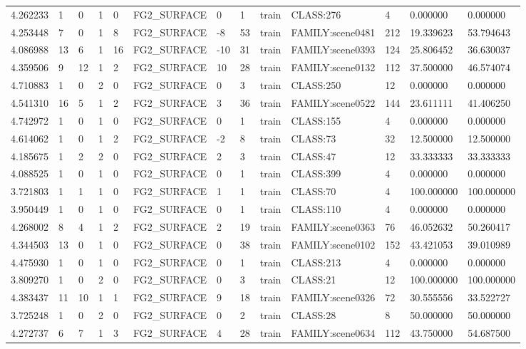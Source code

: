 \begin{tabular}{lllllllllllll}
4.262233 & 1 & 0 & 1 & 0 & FG2\_SURFACE & 0 & 1 & train & CLASS:276 & 4 & 0.000000 & 0.000000 \\
4.253448 & 7 & 0 & 1 & 8 & FG2\_SURFACE & -8 & 53 & train & FAMILY:scene0481 & 212 & 19.339623 & 53.794643 \\
4.086988 & 13 & 6 & 1 & 16 & FG2\_SURFACE & -10 & 31 & train & FAMILY:scene0393 & 124 & 25.806452 & 36.630037 \\
4.359506 & 9 & 12 & 1 & 2 & FG2\_SURFACE & 10 & 28 & train & FAMILY:scene0132 & 112 & 37.500000 & 46.574074 \\
4.710883 & 1 & 0 & 2 & 0 & FG2\_SURFACE & 0 & 3 & train & CLASS:250 & 12 & 0.000000 & 0.000000 \\
4.541310 & 16 & 5 & 1 & 2 & FG2\_SURFACE & 3 & 36 & train & FAMILY:scene0522 & 144 & 23.611111 & 41.406250 \\
4.742972 & 1 & 0 & 1 & 0 & FG2\_SURFACE & 0 & 1 & train & CLASS:155 & 4 & 0.000000 & 0.000000 \\
4.614062 & 1 & 0 & 1 & 2 & FG2\_SURFACE & -2 & 8 & train & CLASS:73 & 32 & 12.500000 & 12.500000 \\
4.185675 & 1 & 2 & 2 & 0 & FG2\_SURFACE & 2 & 3 & train & CLASS:47 & 12 & 33.333333 & 33.333333 \\
4.088525 & 1 & 0 & 1 & 0 & FG2\_SURFACE & 0 & 1 & train & CLASS:399 & 4 & 0.000000 & 0.000000 \\
3.721803 & 1 & 1 & 1 & 0 & FG2\_SURFACE & 1 & 1 & train & CLASS:70 & 4 & 100.000000 & 100.000000 \\
3.950449 & 1 & 0 & 1 & 0 & FG2\_SURFACE & 0 & 1 & train & CLASS:110 & 4 & 0.000000 & 0.000000 \\
4.268002 & 8 & 4 & 1 & 2 & FG2\_SURFACE & 2 & 19 & train & FAMILY:scene0363 & 76 & 46.052632 & 50.260417 \\
4.344503 & 13 & 0 & 1 & 0 & FG2\_SURFACE & 0 & 38 & train & FAMILY:scene0102 & 152 & 43.421053 & 39.010989 \\
4.475930 & 1 & 0 & 1 & 0 & FG2\_SURFACE & 0 & 1 & train & CLASS:213 & 4 & 0.000000 & 0.000000 \\
3.809270 & 1 & 0 & 2 & 0 & FG2\_SURFACE & 0 & 3 & train & CLASS:21 & 12 & 100.000000 & 100.000000 \\
4.383437 & 11 & 10 & 1 & 1 & FG2\_SURFACE & 9 & 18 & train & FAMILY:scene0326 & 72 & 30.555556 & 33.522727 \\
3.725248 & 1 & 0 & 2 & 0 & FG2\_SURFACE & 0 & 2 & train & CLASS:28 & 8 & 50.000000 & 50.000000 \\
4.272737 & 6 & 7 & 1 & 3 & FG2\_SURFACE & 4 & 28 & train & FAMILY:scene0634 & 112 & 43.750000 & 54.687500 \\

\end{tabular}
